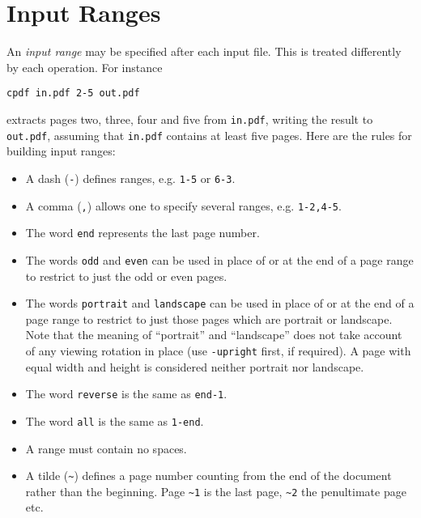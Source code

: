 \documentclass{book}
\begin{document}
  \section{Input Ranges}
  An   \textit{input range} may be specified
after each input file. This is treated differently by each operation. For
instance
  \begin{framed}
  \small\verb!cpdf in.pdf 2-5 out.pdf!
  \end{framed}
  \noindent extracts pages two, three, four and five from \texttt{in.pdf},
writing the result to \texttt{out.pdf}, assuming that \texttt{in.pdf} contains
at least five pages.
  Here are the rules for building input ranges:
  \begin{itemize}
    \item A dash (\texttt{-}) defines ranges, e.g. \texttt{1-5} or \texttt{6-3}.
    \item A comma (\texttt{,}) allows one to specify several ranges, e.g. \texttt{1-2,4-5}.
    \item The word \texttt{end} represents the last page number.
    \item The words \texttt{odd} and \texttt{even} can be used in place of or at the end of a page range to restrict to just the odd or even pages.
    \item The words \texttt{portrait} and \texttt{landscape} can be used in place of or at the end of a page range to restrict to just those pages which are portrait or landscape. Note that the meaning of ``portrait'' and ``landscape'' does not take account of any viewing rotation in place (use \texttt{-upright} first, if required). A page with equal width and height is considered neither portrait nor landscape.
    \item The word \texttt{reverse} is the same as \texttt{end-1}.
    \item The word \texttt{all} is the same as \texttt{1-end}.
    \item A range must contain no spaces.
    \item A tilde (\texttt{\~{}}) defines a page number counting from the end of the document rather than the beginning. Page \texttt{\~{}1} is the last page, \texttt{\~{}2} the penultimate page etc.
  \end{itemize}
 
\end{document}
